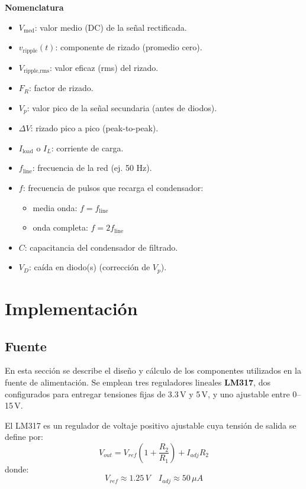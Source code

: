 \documentclass[pdflatex,sn-mathphys-num]{sn-jnl}%
\begin{document}
\begin{minipage}[t]{0.48\textwidth}
\textbf{Nomenclatura}
\begin{itemize}
    \item $V_{\text{med}}$: valor medio (DC) de la señal rectificada.
    \item $v_{\text{ripple}}(t)$: componente de rizado (promedio cero).
    \item $V_{\text{ripple,rms}}$: valor eficaz (rms) del rizado.
    \item $F_R$: factor de rizado.
    \item $V_p$: valor pico de la señal secundaria (antes de diodos).
    \item $\Delta V$: rizado pico a pico (peak-to-peak).
    \item $I_{\text{load}}$ o $I_L$: corriente de carga.
    \item $f_{\text{line}}$: frecuencia de la red (ej. 50 Hz).
    \item $f$: frecuencia de pulsos que recarga el condensador:
    \begin{itemize}
        \item media onda: $f = f_{\text{line}}$
        \item onda completa: $f = 2 f_{\text{line}}$
    \end{itemize}
    \item $C$: capacitancia del condensador de filtrado.
    \item $V_D$: caída en diodo(s) (corrección de $V_p$).
\end{itemize}
\end{minipage}



\section{Implementación}
\subsection{Fuente}


En esta sección se describe el diseño y cálculo de los componentes utilizados en la fuente de alimentación. Se emplean tres reguladores lineales \textbf{LM317}, dos configurados para entregar tensiones fijas de 3.3\,V y 5\,V, y uno ajustable entre 0--15\,V. 

El LM317 es un regulador de voltaje positivo ajustable cuya tensión de salida se define por:
\begin{equation}
    V_{out} = V_{ref}\left(1 + \frac{R_2}{R_1}\right) + I_{adj}R_2
\label{eq:lm317}
\end{equation}
donde:
$$V_{ref} \approx 1.25\,V \quad I_{adj} \approx 50\,\mu A $$
\end{document}
